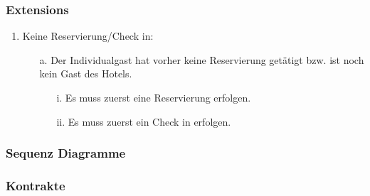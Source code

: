 \documentclass[./detailed_overview_usecases.tex]{subfiles}
\begin{document}
    \subsubsection*{Extensions}
    \begin{enumerate}
        \item Keine Reservierung/Check in:
        \begin{itemize}
            \item[a.] Der Individualgast hat vorher keine Reservierung getätigt bzw. ist noch kein Gast des Hotels.
            \begin{itemize}
                \item[i.] Es muss zuerst eine Reservierung erfolgen.
                \item[ii.] Es muss zuerst ein Check in erfolgen.
            \end{itemize}
        \end{itemize}
    \end{enumerate}

    \subsubsection{Sequenz Diagramme}
    \subsubsection{Kontrakte}
\end{document}
